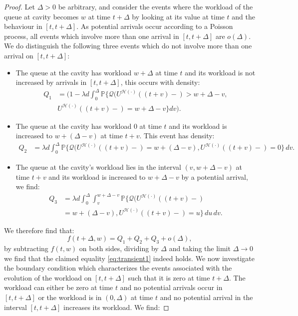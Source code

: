 \documentclass[12pt]{report}
\begin{document}
\begin{proof}


Let $\Delta>0$ be arbitrary, and consider the events where the workload 
of the queue at cavity becomes $w$ at time $t+\Delta$ by looking at its value at time $t$ and the behaviour in $[t,t+\Delta]$. As potential arrivals occur according to a Poisson process, all events which involve more than one arrival in $[t,t+\Delta]$ are $o(\Delta)$. We do distinguish the following three events which do not involve more than one arrival on $[t,t+\Delta]$:
\begin{itemize}[leftmargin=*]
\item The queue at the cavity has workload $w+\Delta$ at time $t$ and its workload is not increased by arrivals in $[t,t+\Delta]$, this occurs with density:
\begin{align*}
Q_1&=\bigg(1-\lambda d \int_0^\Delta \mathbb{P}\bigg\{ \mathcal{Q}(U^{\mathcal{H}(\cdot)}((t+v)-)>w+\Delta-v,\\
& U^{\mathcal{H}(\cdot)}((t+v)-)=w+\Delta-v \bigg\} dv\bigg).
\end{align*}
\item The queue at the cavity has workload $0$ at time $t$ and its workload is increased to $w+(\Delta -v)$ at time $t+v$. This event has density:
\begin{align*}
Q_2&=\lambda d \int_0^\Delta \mathbb{P}\bigg\{ \mathcal{Q}(U^{\mathcal{H}(\cdot)}((t+v)-)=w+(\Delta-v), U^{\mathcal{H}(\cdot)}((t+v)-)=0\bigg\}\, dv.
\end{align*}
\item The queue at the cavity's workload lies in the interval $(v, w+\Delta-v)$ at time $t+v$ and its workload is increased to $w+\Delta-v$ by a potential arrival, we find:
\begin{align*}
Q_3&=\lambda d \int_0^\Delta \int_v^{w+\Delta-v} \mathbb{P}\{\mathcal{Q}(U^{\mathcal{H}(\cdot)}((t+v)-)\\
&=w+(\Delta-v), U^{\mathcal{H}(\cdot)}((t+v)-)=u\}\,du \, dv.
\end{align*}
\end{itemize}
We therefore find that:
$$
f(t+\Delta, w) = Q_1 + Q_2 + Q_3 + o(\Delta),
$$
by subtracting $f(t,w)$ on both sides, dividing by $\Delta$ and taking the limit $\Delta \rightarrow 0$ we find that the claimed equality \eqref{eq:transient1} indeed holds. We now investigate the boundary condition which characterizes the 
events associated with the evolution of the workload on $[t,t+\Delta]$ such that
it is zero at time $t+\Delta$. The workload can either be zero at time $t$ and no potential arrivals occur in $[t,t+\Delta]$ or the workload is in $(0,\Delta)$ at time $t$ and no potential arrival in the interval $[t,t+\Delta]$ increases its workload. We find:

\end{proof}
\end{document}
